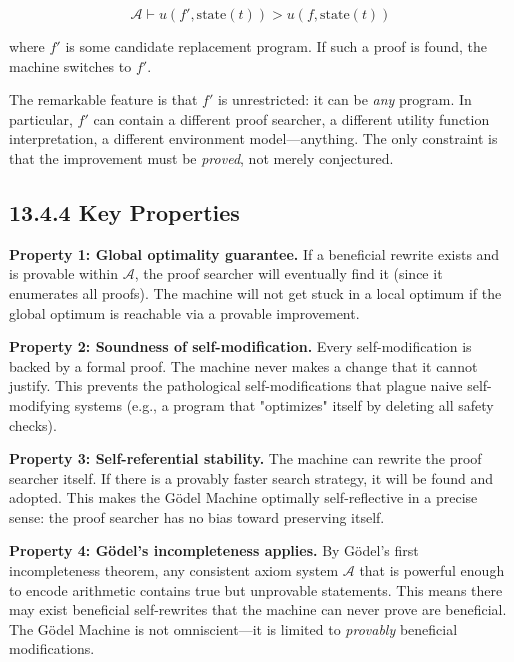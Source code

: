 \[\mathcal{A} \vdash u(f', \text{state}(t)) > u(f, \text{state}(t))\]

where $f'$ is some candidate replacement program. If such a proof is found, the machine switches to $f'$.

The remarkable feature is that $f'$ is unrestricted: it can be \textit{any} program. In particular, $f'$ can contain a different proof searcher, a different utility function interpretation, a different environment model---anything. The only constraint is that the improvement must be \textit{proved}, not merely conjectured.

\subsection{13.4.4 Key Properties}

\textbf{Property 1: Global optimality guarantee.} If a beneficial rewrite exists and is provable within $\mathcal{A}$, the proof searcher will eventually find it (since it enumerates all proofs). The machine will not get stuck in a local optimum if the global optimum is reachable via a provable improvement.

\textbf{Property 2: Soundness of self-modification.} Every self-modification is backed by a formal proof. The machine never makes a change that it cannot justify. This prevents the pathological self-modifications that plague naive self-modifying systems (e.g., a program that "optimizes" itself by deleting all safety checks).

\textbf{Property 3: Self-referential stability.} The machine can rewrite the proof searcher itself. If there is a provably faster search strategy, it will be found and adopted. This makes the Gödel Machine optimally self-reflective in a precise sense: the proof searcher has no bias toward preserving itself.

\textbf{Property 4: Gödel's incompleteness applies.} By Gödel's first incompleteness theorem, any consistent axiom system $\mathcal{A}$ that is powerful enough to encode arithmetic contains true but unprovable statements. This means there may exist beneficial self-rewrites that the machine can never prove are beneficial. The Gödel Machine is not omniscient---it is limited to \textit{provably} beneficial modifications.

